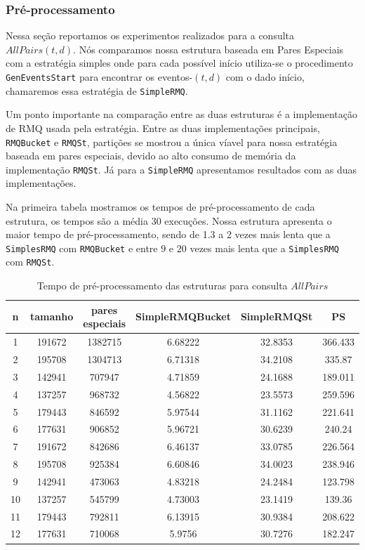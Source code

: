 \documentclass[12pt]{article}
\begin{document}
\subsubsection{Pré-processamento}
Nessa seção reportamos os experimentos realizados para a consulta $AllPairs(t,d)$.
Nós comparamos nossa estrutura baseada em Pares Especiais com a estratégia simples onde para cada possível
início utiliza-se o procedimento {\tt GenEventsStart} para encontrar os eventos-$(t,d)$ com o dado início,
chamaremos essa estratégia de {\tt SimpleRMQ}.

Um ponto importante na comparação entre as duas estruturas é a implementação de RMQ usada pela estratégia. 
Entre as duas implementações principais, {\tt RMQBucket} e {\tt RMQSt}, partições se mostrou a única víavel para 
nossa estratégia baseada em pares especiais, devido ao alto consumo de memória da implementação {\tt RMQSt}.
Já para a {\tt SimpleRMQ} apresentamos resultados com as duas implementações.

Na primeira tabela mostramos os tempos de pré-processamento de cada estrutura, os tempos são a média 30 execuções.
Nossa estrutura apresenta o maior tempo de pré-processamento,  sendo de 1.3 a 2 vezes mais lenta que a {\tt SimplesRMQ}
 com {\tt RMQBucket} e entre $9$ e $20$ vezes mais lenta que a {\tt SimplesRMQ}  com {\tt RMQSt}.


\begin{table}
\small
\begin{center}
\begin{tabular}{|c|c|c|c|c|c|}
\hline
\textbf{n} & \textbf{tamanho} & \textbf{pares especiais} & \textbf{SimpleRMQBucket} & \textbf{SimpleRMQSt} & \textbf{PS}\\
\hline
1 & 191672 & 1382715 & 6.68222 & 32.8353 & 366.433\\
\hline
2 & 195708 & 1304713 & 6.71318 & 34.2108 & 335.87\\
\hline
3 & 142941 & 707947 & 4.71859 & 24.1688 & 189.011\\
\hline
4 & 137257 & 968732 &  4.56822 &  23.5573 & 259.596\\
\hline
5 & 179443 & 846592 &  5.97544 & 31.1162 & 221.641\\
\hline
6 & 177631 & 906852 & 5.96721 & 30.6239 & 240.24\\
\hline
7 &  191672 & 842686 &  6.46137 & 33.0785 & 226.564\\
\hline
8 & 195708 &  925384 &  6.60846 &  34.0023 & 238.946\\
\hline
9 & 142941 & 473063 &  4.83218 & 24.2484 &  123.798\\
\hline
10 &  137257 &  545799 &  4.73003 & 23.1419 & 139.36\\
\hline
11 &  179443 &  792811 &  6.13915 &  30.9384 &  208.622\\
\hline
12 &  177631 & 710068 & 5.9756 & 30.7276 & 182.247\\
\hline
\end{tabular}

\end{center}
\label{tab:all_pre_series}
\caption{Tempo de pré-processamento das estruturas para consulta $AllPairs$}
\normalsize
\end{table}
\end{document}

